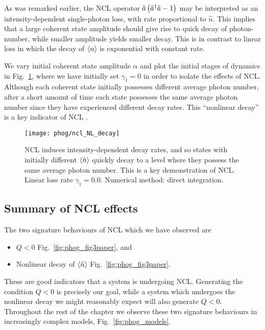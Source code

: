 As was remarked earlier, the NCL operator $\hat{a}\left(\hat{a}^\dagger \hat{a} - 1\right)$ may be interpreted as an intensity-dependent single-photon loss, with rate proportional to $\hat{n}$. This implies that a large coherent state amplitude should give rise to quick decay of photon-number, while smaller amplitude yields smaller decay. This is in contrast to linear loss in which the decay of $\ev{n}$ is exponential with constant rate.

We vary initial coherent state amplitude $\alpha$ and plot the initial stages of dynamics in Fig.~\ref{fig:phog_ncl_NL_decay}, where we have initially set $\gamma_1=0$ in order to isolate the effects of NCL. Although each coherent state initially possesses different average photon number, after a short amount of time each state possesses the same average photon number since they have experienced different decay rates. This ``nonlinear decay'' is a key indicator of NCL \cite{Mogilevtsev2010, Shchesnovich2011}.

\begin{figure}[htp]
\captionsetup{width=\linewidth}
\centering
\texttt{[image: phog/ncl\_NL\_decay]}
\caption{\label{fig:phog_ncl_NL_decay} NCL induces intensity-dependent decay rates, and so states with initially different $\ev{\hat{n}}$ quickly decay to a level where they possess the same average photon number. This is a key demonstration of NCL. Linear loss rate $\gamma_1 = 0.0$. Numerical method: direct integration.}
\end{figure}

\FloatBarrier
\subsection{Summary of NCL effects}\label{sec:phog_summary_ncl_effects}
The two signature behaviours of NCL which we have observed are
\begin{itemize}
\item $Q < 0$ Fig.~\ref{fig:phog_fig3paper}, and 
\item Nonlinear decay of $\ev{\hat{n}}$ Fig.~\ref{fig:phog_fig3paper}.
\end{itemize}
These are good indicators that a system is undergoing NCL. Generating the condition $Q<0$ is precisely our goal, while a system which undergoes the nonlinear decay we might reasonably expect will also generate $Q<0$. Throughout the rest of the chapter we observe these two signature behaviours in increasingly complex models, Fig.~\ref{fig:phog_models}.


